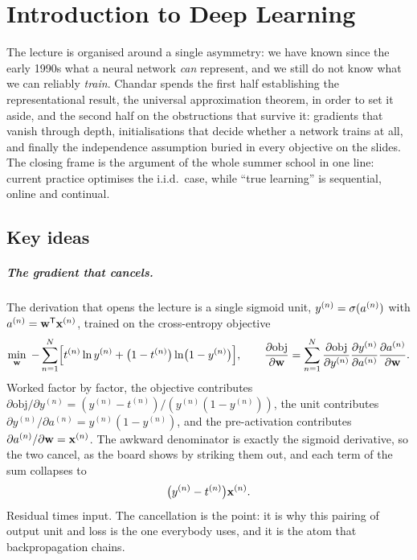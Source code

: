 \chapter{Introduction to Deep Learning}
\label{ch:01-intro-deep-learning}


The lecture is organised around a single asymmetry: we have known since the early 1990s
what a neural network \emph{can} represent, and we still do not know what we can reliably
\emph{train}. Chandar spends the first half establishing the representational result, the
universal approximation theorem, in order to set it aside, and the second half on the
obstructions that survive it: gradients that vanish through depth, initialisations that
decide whether a network trains at all, and finally the independence assumption buried in
every objective on the slides. The closing frame is the argument of the whole summer school
in one line: current practice optimises the i.i.d.\ case, while ``true learning'' is
sequential, online and continual.

\section*{Key ideas}

\paragraph{The gradient that cancels.} The derivation that opens the lecture is a single
sigmoid unit, $y^{(n)} = \sigma(a^{(n)})$ with $a^{(n)} = \mathbf{w}^{\mathsf{T}}\mathbf{x}^{(n)}$, trained on
the cross-entropy objective
\[
  \min_{\mathbf{w}} \; -\sum_{n=1}^{N} \Bigl[ t^{(n)} \ln y^{(n)}
    + \bigl(1 - t^{(n)}\bigr) \ln\bigl(1 - y^{(n)}\bigr) \Bigr],
  \qquad
  \frac{\partial \mathrm{obj}}{\partial \mathbf{w}}
   = \sum_{n=1}^{N} \frac{\partial \mathrm{obj}}{\partial y^{(n)}}
     \frac{\partial y^{(n)}}{\partial a^{(n)}}
     \frac{\partial a^{(n)}}{\partial \mathbf{w}}.
\]
\noindent Worked factor by factor, the objective contributes
$\partial \mathrm{obj} / \partial y^{(n)} = (y^{(n)} - t^{(n)}) / (y^{(n)}(1 - y^{(n)}))$,
the unit contributes $\partial y^{(n)} / \partial a^{(n)} = y^{(n)}(1 - y^{(n)})$, and the
pre-activation contributes $\partial a^{(n)} / \partial \mathbf{w} = \mathbf{x}^{(n)}$. The awkward
denominator is exactly the sigmoid derivative, so the two cancel, as the board shows by
striking them out, and each term of the sum collapses to
\[
  \bigl(y^{(n)} - t^{(n)}\bigr)\mathbf{x}^{(n)}.
\]
\noindent Residual times input. The cancellation is the point: it is why this pairing of
output unit and loss is the one everybody uses, and it is the atom that backpropagation
chains.

